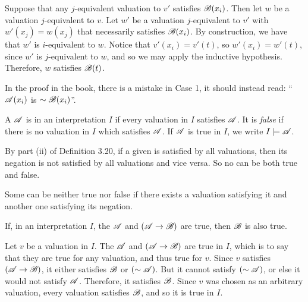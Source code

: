 \begin{proposition}
\begin{enumerate}
      \La{} Suppose that any \(j\)-equivalent valuation to \(v'\) satisfies \(\mathscr{B}(x_i)\). Then let \(w\) be a valuation \(j\)-equivalent to \(v\). Let \(w'\) be a valuation \(j\)-equivalent to \(v'\) with \(w'(x_j) = w(x_j)\) that necessarily satisfies \(\mathscr{B}(x_i)\). By construction, we have that \(w'\) is \(i\)-equivalent to \(w\). Notice that \(v'(x_i) = v'(t)\), so \(w'(x_i) = w'(t)\), since \(w'\) is \(j\)-equivalent to \(w\), and so we may apply the inductive hypothesis. Therefore, \(w\) satisfies \(\mathscr{B}(t)\).
  \end{enumerate}

  \note{} In the proof in the book, there is a mistake in Case 1, it should instead read: ``\(\mathscr{A}(x_i)\) is \(\sim\mathscr{B}(x_i)\)''.
\end{proposition}

\begin{definition}
  A \wf{} \(\mathscr{A}\) is  in an interpretation \(I\) if every valuation in \(I\) satisfies \(\mathscr{A}\). It is \textit{false} if there is no valuation in \(I\) which satisfies \(\mathscr{A}\). If \(\mathscr{A}\) is true in \(I\), we write \(I \models \mathscr{A}\).

  \note{} By part (ii) of Definition 3.20, if a given \wf{} is satisfied by all valuations, then its negation is not satisfied by all valuations and vice versa. So no \wf{} can be both true and false.

  \note{} Some \wfs{} can be neither true nor false if there exists a valuation satisfying it and another one satisfying its negation.
\end{definition}

\setcounter{definition}{25}
\begin{proposition}
  If, in an interpretation \(I\), the \wf{} \(\mathscr{A}\) and \((\mathscr{A} \rightarrow \mathscr{B})\) are true, then \(\mathscr{B}\) is also true.

  \prf{} Let \(v\) be a valuation in \(I\). The \wfs{} \(\mathscr{A}\) and \((\mathscr{A} \rightarrow \mathscr{B})\) are true in \(I\), which is to say that they are true for any valuation, and thus true for \(v\). Since \(v\) satisfies \((\mathscr{A} \rightarrow \mathscr{B})\), it either satisfies \(\mathscr{B}\) or \((\sim\mathscr{A})\). But it cannot satisfy \((\sim\mathscr{A})\), or else it would not satisfy \(\mathscr{A}\). Therefore, it satisfies \(\mathscr{B}\). Since \(v\) was chosen as an arbitrary valuation, every valuation satisfies \(\mathscr{B}\), and so it is true in \(I\).
\end{proposition}

